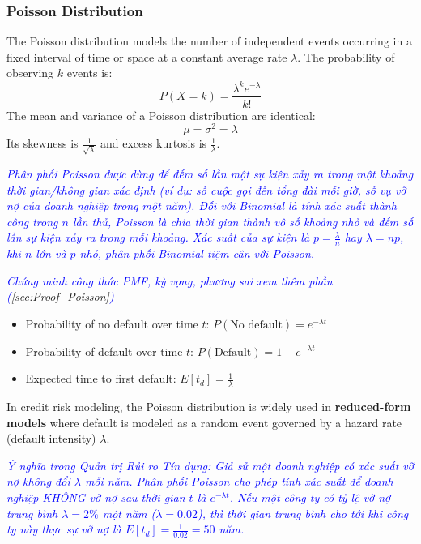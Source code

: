 \subsubsection{Poisson Distribution}
The Poisson distribution models the number of independent events occurring in a fixed interval of time or space at a constant average rate $\lambda$. The probability of observing $k$ events is:
\begin{equation}
	P(X=k) = \frac{\lambda^k e^{-\lambda}}{k!}
	\label{eq:poisson_pmf_m6}
\end{equation}
The mean and variance of a Poisson distribution are identical:
\begin{equation}
	\mu = \sigma^2 = \lambda
	\label{eq:poisson_moments_m6}
\end{equation}
Its skewness is $\frac{1}{\sqrt{\lambda}}$ and excess kurtosis is $\frac{1}{\lambda}$.

\textcolor{blue}{\textit{Phân phối Poisson được dùng để đếm số lần một sự kiện xảy ra trong một khoảng thời gian/không gian xác định (ví dụ: số cuộc gọi đến tổng đài mỗi giờ, số vụ vỡ nợ của doanh nghiệp trong một năm).
Đối với Binomial là tính xác suất thành công trong $n$ lần thử, Poisson là chia thời gian thành vô số khoảng nhỏ và đếm số lần sự kiện xảy ra trong mỗi khoảng.
Xác suất của sự kiện là $p=\frac{\lambda}{n}$ hay $\lambda=np$, khi $n$ lớn và $p$ nhỏ, phân phối Binomial tiệm cận với Poisson.}}

\textcolor{blue}{\textit{Chứng minh công thức PMF, kỳ vọng, phương sai xem thêm phần (\ref{sec:Proof_Poisson})}}

\begin{itemize}
	\item Probability of no default over time $t$: $P(\text{No default}) = e^{-\lambda t}$
	\item Probability of default over time $t$: $P(\text{Default}) = 1 - e^{-\lambda t}$
	\item Expected time to first default: $E[t_d] = \frac{1}{\lambda}$
\end{itemize}
In credit risk modeling, the Poisson distribution is widely used in \textbf{reduced-form models} where default is modeled as a random event governed by a hazard rate (default intensity) $\lambda$.

\textcolor{blue}{\textit{Ý nghĩa trong Quản trị Rủi ro Tín dụng: Giả sử một doanh nghiệp có xác suất vỡ nợ không đổi $\lambda$ mỗi năm. Phân phối Poisson cho phép tính xác suất để doanh nghiệp KHÔNG vỡ nợ sau thời gian $t$ là $e^{-\lambda t}$. Nếu một công ty có tỷ lệ vỡ nợ trung bình $\lambda = 2\%$ một năm ($\lambda = 0.02$), thì thời gian trung bình cho tới khi công ty này thực sự vỡ nợ là $E[t_d] = \frac{1}{0.02} = 50$ năm.}}

